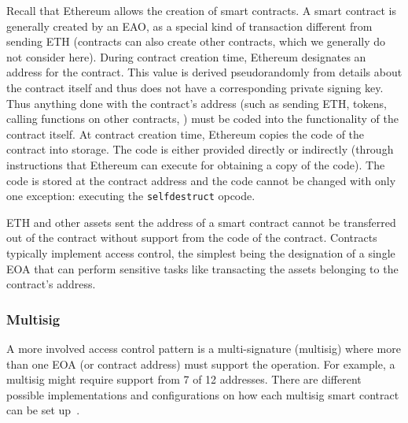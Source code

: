 Recall that Ethereum allows the creation of smart contracts. A smart contract is generally created by an EAO, as a special kind of transaction different from sending ETH (contracts can also create other contracts, which we generally do not consider here). During contract creation time, Ethereum designates an address for the contract. This value is derived pseudorandomly from details about the contract itself and thus does not have a corresponding private signing key. Thus anything done with the contract's address (such as sending ETH, tokens, calling functions on other contracts, \etc) must be coded into the functionality of the contract itself. At contract creation time, Ethereum copies the code of the contract into storage. The code is either provided directly or indirectly (through instructions that Ethereum can execute for obtaining a copy of the code). The code is stored at the contract address and the code cannot be changed with only one exception: executing the \texttt{selfdestruct} opcode. 

ETH and other assets sent the address of a smart contract cannot be transferred out of the contract without support from the code of the contract. Contracts typically implement access control, the simplest being the designation of a single EOA that can perform sensitive tasks like transacting the assets belonging to the contract's address. 

\subsubsection{Multisig}

A more involved access control pattern is a multi-signature (multisig) where more than one EOA (or contract address) must support the operation. For example, a multisig might require support from 7 of 12 addresses. There are different possible implementations and configurations on how each multisig smart contract can be set up~\cite{ittay2021wallet}.  
 
